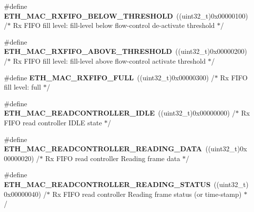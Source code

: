 \begin{DoxyCompactItemize}
\#define {\bfseries E\+T\+H\+\_\+\+M\+A\+C\+\_\+\+R\+X\+F\+I\+F\+O\+\_\+\+B\+E\+L\+O\+W\+\_\+\+T\+H\+R\+E\+S\+H\+O\+LD}~((uint32\+\_\+t)0x00000100)  /$\ast$ Rx F\+I\+F\+O fill level\+: fill-\/level below flow-\/control de-\/activate threshold $\ast$/
\item 
\mbox{\label{group___h_a_l___e_t_h___aliased___defines_ga10d4ac5728fe85efe0ec19699e4c90f0}} 
\#define {\bfseries E\+T\+H\+\_\+\+M\+A\+C\+\_\+\+R\+X\+F\+I\+F\+O\+\_\+\+A\+B\+O\+V\+E\+\_\+\+T\+H\+R\+E\+S\+H\+O\+LD}~((uint32\+\_\+t)0x00000200)  /$\ast$ Rx F\+I\+F\+O fill level\+: fill-\/level above flow-\/control activate threshold $\ast$/
\item 
\mbox{\label{group___h_a_l___e_t_h___aliased___defines_gaa7b77138ec3256a713a8aa74ea94f0c1}} 
\#define {\bfseries E\+T\+H\+\_\+\+M\+A\+C\+\_\+\+R\+X\+F\+I\+F\+O\+\_\+\+F\+U\+LL}~((uint32\+\_\+t)0x00000300)  /$\ast$ Rx F\+I\+F\+O fill level\+: full $\ast$/
\item 
\mbox{\label{group___h_a_l___e_t_h___aliased___defines_ga0be388dadd31f6a12f2ee9b4ee6c31bb}} 
\#define {\bfseries E\+T\+H\+\_\+\+M\+A\+C\+\_\+\+R\+E\+A\+D\+C\+O\+N\+T\+R\+O\+L\+L\+E\+R\+\_\+\+I\+D\+LE}~((uint32\+\_\+t)0x00000000)  /$\ast$ Rx F\+I\+F\+O read controller I\+D\+L\+E state $\ast$/
\item 
\mbox{\label{group___h_a_l___e_t_h___aliased___defines_ga056b776e92442c623c3d848314e6c8f0}} 
\#define {\bfseries E\+T\+H\+\_\+\+M\+A\+C\+\_\+\+R\+E\+A\+D\+C\+O\+N\+T\+R\+O\+L\+L\+E\+R\+\_\+\+R\+E\+A\+D\+I\+N\+G\+\_\+\+D\+A\+TA}~((uint32\+\_\+t)0x00000020)  /$\ast$ Rx F\+I\+F\+O read controller Reading frame data $\ast$/
\item 
\mbox{\label{group___h_a_l___e_t_h___aliased___defines_ga441228e7ee2416d37f22f5081d739e2c}} 
\#define {\bfseries E\+T\+H\+\_\+\+M\+A\+C\+\_\+\+R\+E\+A\+D\+C\+O\+N\+T\+R\+O\+L\+L\+E\+R\+\_\+\+R\+E\+A\+D\+I\+N\+G\+\_\+\+S\+T\+A\+T\+US}~((uint32\+\_\+t)0x00000040)  /$\ast$ Rx F\+I\+F\+O read controller Reading frame status (or time-\/stamp) $\ast$/
\item 
\mbox{\label{group___h_a_l___e_t_h___aliased___defines_ga7a4fe56723328085b9b80adbfb528a5d}} 

\end{DoxyCompactItemize}
